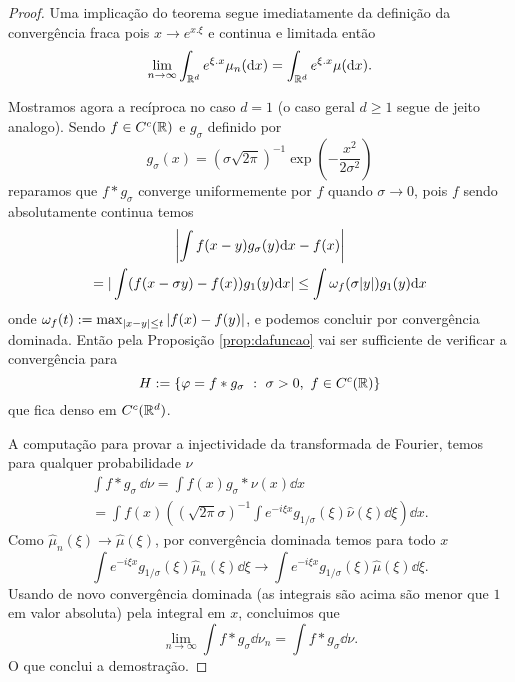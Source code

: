 \begin{proof}
 Uma implicação do teorema segue imediatamente da definição da convergência fraca pois
 $x \to e^{x.\xi}$ e continua e limitada então
 \begin{equation}
 \lim_{n\to \infty}\int_{{\mathbb R}^d} e^{\xi.x} \mu_n(\mathrm{d} x)=\int_{{\mathbb R}^d} e^{\xi.x} \mu(\mathrm{d} x).
 \end{equation}

 \medskip

 Mostramos agora a recíproca no caso $d=1$ (o caso geral $d\ge 1$ segue de jeito analogo).
 Sendo $f\in C^c({\mathbb R})$ e $g_{\sigma}$ definido por
 $$ g_{\sigma}(x)=(\sigma \sqrt{2\pi})^{-1} \exp\left(-\frac{x^2}{2\sigma^2}\right) $$
 reparamos que $f\ast g_{\sigma}$ converge uniformemente por $f$ quando $\sigma \to 0$, pois
 $f$ sendo absolutamente continua temos
 \begin{multline}
  \left |\int f(x-y) g_{\sigma}(y) \mathrm{d} x -f(x) \right|\\
  =   |\int (f(x-\sigma y)-f(x)) g_{1}(y) \mathrm{d} x|
  \le \int \omega_f(\sigma |y|) g_{1}(y) \mathrm{d} x
 \end{multline}
onde $\omega_f(t):= \max_{|x-y|\le t} |f(x)-f(y)|$, e podemos concluir por convergência dominada.
Então pela Proposição \ref{prop:dafuncao} vai ser sufficiente de verificar a convergência para
$$H:= \{ \varphi=f \ast g_{\sigma}\ : \ \sigma>0, \ f\in C^c({\mathbb R})  \}$$
 que fica denso em $C^c({\mathbb R}^d)$.

 \medskip

 A computação para provar a injectividade da transformada de Fourier, temos para qualquer probabilidade $\nu$
 \begin{multline}
  \int f \ast g_{\sigma} \ \dd \nu= \int f(x) g_{\sigma} \ast \nu(x) \dd x\\
  =\int f(x)  \left( (\sqrt{2\pi} \sigma)^{-1}\int e^{-i\xi x}g_{1/\sigma}(\xi) \hat \nu(\xi)
  \dd
  \xi \right) \dd x.
 \end{multline}
Como $\hat \mu_n(\xi) \to \hat \mu(\xi)$, por convergência dominada temos para todo $x$
 $$\int e^{-i\xi x}g_{1/\sigma}(\xi) \hat \mu_n(\xi)
  \dd
  \xi  \to \int e^{-i\xi x}g_{1/\sigma}(\xi) \hat \mu(\xi)
  \dd
  \xi.$$
  Usando de novo convergência dominada (as integrais são acima são menor que $1$ em valor absoluta) pela integral em $x$, concluimos que
  \begin{equation}
    \lim_{n\to \infty} \int f \ast g_{\sigma} \dd \nu_n = \int f \ast g_{\sigma} \dd \nu.
  \end{equation}
O que conclui a demostração.
\end{proof}


